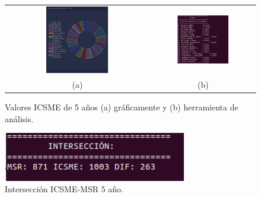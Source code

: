 \documentclass[a4paper, 12pt]{book}
\begin{document}
\begin{figure}[!h]
    \centering
    \begin{tabular}{cc}
    \includegraphics[width=0.45\textwidth]{img/icsme_5_year_graph.png} &  
    \includegraphics[width=0.52\textwidth]{img/icsme_5_year.png} \\ 
    (a) &(b) 
    \end{tabular}
    \caption{Valores ICSME de 5 años (a) gráficamente y (b) herramienta de análisis.}
    \label{fig:comp_icsme_1_year}
\end{figure}

\begin{figure}[h]
  \centering
  \includegraphics[width=8cm, keepaspectratio]{img/inter_5_year.png}
  \caption{Intersección ICSME-MSR 5 año.}
  \label{fig:inter_5_year}
\end{figure}
\end{document}
